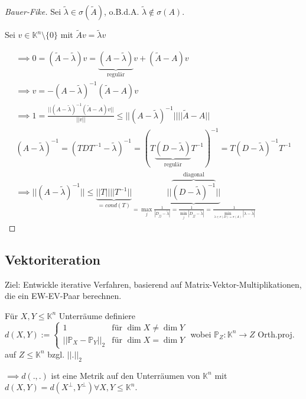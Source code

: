 \begin{proof}[Bauer-Fike]
	Sei $\tilde{\lambda} \in \sigma(\tilde{A})$, o.B.d.A. $\tilde{\lambda} \notin \sigma(A)$.
	
	Sei $v \in \mathbb{K}^n\setminus\{0\}$ mit $\tilde{A}v = \tilde{\lambda}v$
	
	\begin{align*}
		\implies 0 = (\tilde{A} - \tilde{\lambda})v = \underbrace{(A - \tilde{\lambda})}_{\text{regulär}}v + (\tilde{A} - A)v\\
		\implies v = -(A - \tilde{\lambda})^{-1}(\tilde{A} - A)v\\
		\implies 1 = \frac{||(A - \tilde{\lambda})^{-1}(\tilde{A} - A)v||}{||v||} \leq ||(A-\tilde{\lambda})^{-1}|| ||\tilde{A} - A||\\
		(A - \tilde{\lambda})^{-1} = (TDT^{-1} - \tilde{\lambda})^{-1} = (T \underbrace{(D-\tilde{\lambda})}_{\text{regulär}}T^{-1})^{-1} = T(D - \tilde{\lambda})^{-1}T^{-1}\\
		\implies ||(A - \tilde{\lambda})^{-1}|| \leq \underbrace{||T|| ||T^{-1}||}_{=cond(T)} \underbrace{||\overbrace{(D-\tilde{\lambda})^{-1}}^{\text{diagonal}}||}_{=\max_j \frac{1}{|D_{jj} - \tilde{\lambda}|} = \frac{1}{\min_j |D_{jj} - \tilde{\lambda}|} = \frac{1}{\min_{\lambda \in \sigma(D) = \sigma(A)}|\lambda - \tilde{\lambda}|}}
	\end{align*}
\end{proof}

\subsection{Vektoriteration}

Ziel: Entwickle iterative Verfahren, basierend auf Matrix-Vektor-Multiplikationen, die ein EW-EV-Paar berechnen.

\begin{lemma}
	Für $X,Y \leq \mathbb{K}^n$ Unterräume definiere $d(X,Y) := \begin{cases}
		1 & \text{für } \dim X \neq \dim Y\\
		|| \mathbb{P}_X - \mathbb{P}_Y ||_2 & \text{für } \dim X = \dim Y
	\end{cases}$ wobei $\mathbb{P}_Z: \mathbb{K}^n \rightarrow Z$ Orth.proj. auf $Z \leq \mathbb{K}^n$ bzgl. $||.||_2$
	
	$\implies d(., .)$ ist eine Metrik auf den Unterräumen von $\mathbb{K}^n$ mit $d(X,Y) = d(X^\perp, Y^\perp) \forall X,Y \leq \mathbb{K}^n$.
\end{lemma}

